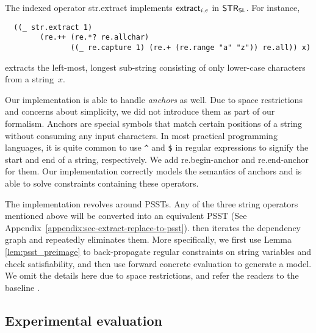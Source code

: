 The indexed operator {\sf str.extract} implements $\mathsf{extract}_{i, e}$ in
$\mathsf{STR}_{\mathsf{SL}}$. For instance,
%
{\small
\begin{verbatim}
  ((_ str.extract 1)
        (re.++ (re.*? re.allchar)
               ((_ re.capture 1) (re.+ (re.range "a" "z")) re.all)) x)
\end{verbatim}
}
extracts the left-most, longest sub-string consisting of only lower-case
characters from a string~$x$.

Our implementation is able to handle \textit{anchors} as well. Due to space restrictions and concerns about simplicity, we did not introduce them as part of our formalism. Anchors are special symbols that match certain positions of a string without consuming any input characters. In most practical programming languages, it is quite common to use \verb!^! and \verb!$! in regular expressions to signify the start and end of a string, respectively. We add \textsf{re.begin-anchor} and \textsf{re.end-anchor} for them. Our implementation correctly models the semantics of anchors and is able to solve constraints containing these operators.

The implementation revolves around PSSTs. Any of the three string operators mentioned above will be converted into an equivalent PSST (See Appendix~\ref{appendix:sec-extract-replace-to-psst}). {\ostrich} then iterates the dependency graph and repeatedly eliminates them. More specifically, we first use Lemma \ref{lem:psst_preimage} to back-propagate regular constraints on string variables and check satisfiability, and then use forward concrete evaluation to generate a model. We omit the details here due to space restrictions, and refer the readers to the baseline \cite{CHL+19}.

\subsection{Experimental evaluation}

